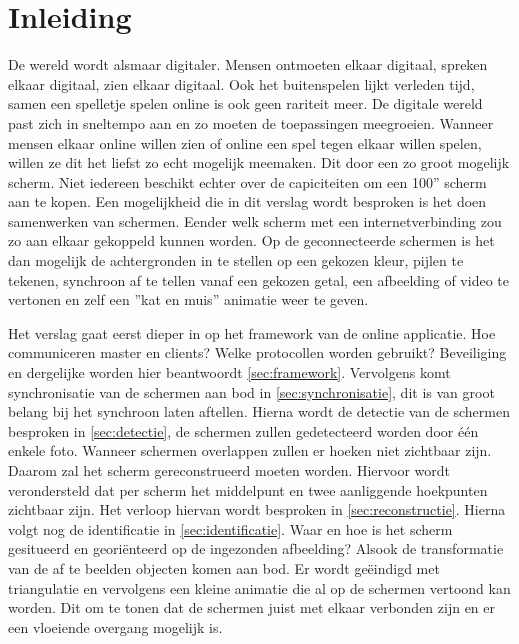 \section{Inleiding}
De wereld wordt alsmaar digitaler. Mensen ontmoeten elkaar digitaal, spreken elkaar digitaal, zien elkaar digitaal. Ook het buitenspelen lijkt verleden tijd, samen een spelletje spelen online is ook geen rariteit meer. De digitale wereld past zich in sneltempo aan en zo moeten de toepassingen meegroeien. Wanneer mensen elkaar online willen zien of online een spel tegen elkaar willen spelen, willen ze dit het liefst zo echt mogelijk meemaken. Dit door een zo groot mogelijk scherm. Niet iedereen beschikt echter over de capiciteiten om een 100'' scherm aan te kopen. Een mogelijkheid die in dit verslag wordt besproken is het doen samenwerken van schermen. Eender welk scherm met een internetverbinding zou zo aan elkaar gekoppeld kunnen worden. Op de geconnecteerde schermen is het dan mogelijk de achtergronden in te stellen op een gekozen kleur, pijlen te tekenen, synchroon af te tellen vanaf een gekozen getal, een afbeelding of video te vertonen en zelf een ''kat en muis'' animatie weer te geven.

Het verslag gaat eerst dieper in op het framework van de online applicatie. Hoe communiceren master en clients? Welke  protocollen worden gebruikt? Beveiliging en dergelijke worden hier beantwoordt \ref{sec:framework}. Vervolgens komt synchronisatie van de schermen aan bod in \ref{sec:synchronisatie}, dit is van groot belang bij het synchroon laten aftellen. Hierna wordt de detectie van de schermen besproken in \ref{sec:detectie}, de schermen zullen gedetecteerd worden door één enkele foto. Wanneer schermen overlappen zullen er hoeken niet zichtbaar zijn. Daarom zal het scherm gereconstrueerd moeten worden. Hiervoor wordt verondersteld dat per scherm het middelpunt en twee aanliggende hoekpunten zichtbaar zijn. Het verloop hiervan wordt besproken in \ref{sec:reconstructie}. Hierna volgt nog de identificatie in \ref{sec:identificatie}. Waar en hoe is het scherm gesitueerd en georiënteerd op de ingezonden afbeelding? Alsook de transformatie van de af te beelden objecten komen aan bod. Er wordt geëindigd met triangulatie en vervolgens een kleine animatie die al op de schermen vertoond kan worden. Dit om te tonen dat de schermen juist met elkaar verbonden zijn en er een vloeiende overgang mogelijk is. 